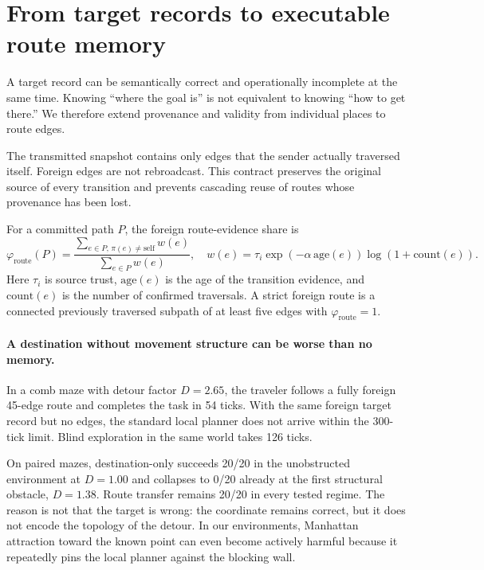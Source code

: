 \documentclass{article}
\newcommand{\phiroute}{\varphi_{\mathrm{route}}}
\begin{document}
\FloatBarrier
\section{From target records to executable route memory}

A target record can be semantically correct and operationally incomplete at the same time. Knowing ``where the goal is'' is not equivalent to knowing ``how to get there.'' We therefore extend provenance and validity from individual places to route edges.

The transmitted snapshot contains only edges that the sender actually traversed itself. Foreign edges are not rebroadcast. This contract preserves the original source of every transition and prevents cascading reuse of routes whose provenance has been lost.

For a committed path $P$, the foreign route-evidence share is
\begin{equation}
\phiroute(P)=
\frac{\sum_{e\in P,\,\pi(e)\neq\mathrm{self}} w(e)}
{\sum_{e\in P} w(e)},\quad
w(e)=\tau_i \exp(-\alpha\,\mathrm{age}(e))\log(1+\mathrm{count}(e)).
\label{eq:routephi}
\end{equation}
Here $\tau_i$ is source trust, $\mathrm{age}(e)$ is the age of the transition evidence, and $\mathrm{count}(e)$ is the number of confirmed traversals. A strict foreign route is a connected previously traversed subpath of at least five edges with $\phiroute=1$.

\paragraph{A destination without movement structure can be worse than no memory.}
In a comb maze with detour factor $D=2.65$, the traveler follows a fully foreign 45-edge route and completes the task in 54 ticks. With the same foreign target record but no edges, the standard local planner does not arrive within the 300-tick limit. Blind exploration in the same world takes 126 ticks.

On paired mazes, destination-only succeeds 20/20 in the unobstructed environment at $D=1.00$ and collapses to 0/20 already at the first structural obstacle, $D=1.38$. Route transfer remains 20/20 in every tested regime. The reason is not that the target is wrong: the coordinate remains correct, but it does not encode the topology of the detour. In our environments, Manhattan attraction toward the known point can even become actively harmful because it repeatedly pins the local planner against the blocking wall.
\end{document}
